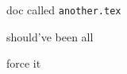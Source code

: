 \documentclass{article}
\begin{document}
doc called \verb|another.tex|

should've been all

force it
\end{document}
